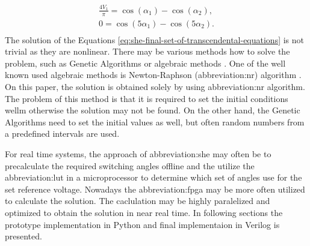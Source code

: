 \documentclass[a4paper, twoside, 11pt]{article}
\begin{document}
            \begin{equation}
                \begin{gathered}
                    \frac{4 V_1}{\pi} = \cos(\alpha_1) - \cos(\alpha_2),\\
                    0 = \cos(5 \alpha_1) - \cos(5 \alpha_2).\\
                \end{gathered}
                \label{eq:she-final-set-of-transcendental-equations}
            \end{equation}
            The solution of the Equations \ref{eq:she-final-set-of-transcendental-equations} is not trivial as they are nonlinear. There may be various methods how to solve the problem, such as Genetic Algorithms \cite{taghizadeh-Harmonic-elimination-of-multilevel-inverters-using-particle-swarm-optimization, Ortiz-Espinoza-PWM-with-Selective-Harmonic-Elimination-Using-Optimization-Inspired-on-Earthquakes-for-AC-Electric-Drives, Abdelqawee_Naser-SELECTIVE-HARMONIC-ELIMINATION-PWM-VOLTAGE-SOURCE-INVERTER-BASED-ON-GENETIC-ALGORITHM} or algebraic methods \cite{wang-A-Comprehensive-Review-of-Solving-Selective-Harmonic-Elimination-Problem-with-Algebraic-Algorithms, Chiasson-A-Complete-Solution-to-the-Harmonic-Elimination-Problem}. One of the well known used algebraic methods is Newton-Raphson (\gls{abbreviation:nr}) algorithm \cite{Balow-A-Selective-Harmonic-Elimination-SHE-Technique-for-the-Multi-Leveled-Inverters}. On this paper, the solution is obtained solely by using \gls{abbreviation:nr} algorithm. The problem of this method is that it is required to set the initial conditions wellm otherwise the solution may not be found. On the other hand, the Genetic Algorithms need to set the initial values as well, but often random numbers from a predefined intervals are used.\par
            For real time systems, the approach of \gls{abbreviation:she} may often be to precalculate the required switching angles offline and the utilize the \gls{abbreviation:lut} in a microprocessor to determine which set of angles use for the set reference voltage. Nowadays the \gls{abbreviation:fpga} may be more often utilized to calculate the solution. The caclulation may be highly paralelized and optimized to obtain the solution in near real time. In following sections the prototype implementation in Python and final implementaion in Verilog is presented.
\end{document}
